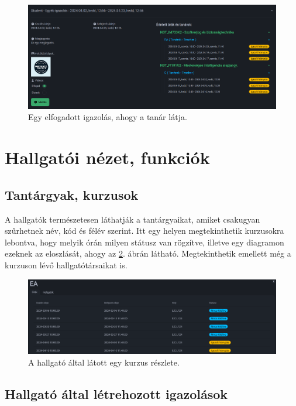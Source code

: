 \documentclass[
]{thesis-ekf}
\theoremstyle{definition}
\theoremstyle{remark}
\begin{document}
\begin{figure}[ht!]
	\centering
	\includegraphics[width=15cm]{../pictures/screenshots/just_teacher.png}
	\caption{Egy elfogadott igazolás, ahogy a tanár látja.}
	\label{justTeacher}
\end{figure}

\section{Hallgatói nézet, funkciók}

\subsection{Tantárgyak, kurzusok}

A hallgatók természetesen láthatják a tantárgyaikat, amiket csakugyan szűrhetnek név, kód és félév szerint. Itt egy helyen megtekinthetik kurzusokra lebontva, hogy melyik órán milyen státusz van rögzítve, illetve egy diagramon ezeknek az eloszlását, ahogy az \ref{studentCourse}. ábrán látható. Megtekinthetik emellett még a kurzuson lévő hallgatótársaikat is.

\begin{figure}[h!]
	\centering
	\includegraphics[width=15cm]{../pictures/screenshots/student_course.png}
	\caption{A hallgató által látott egy kurzus részlete.}
	\label{studentCourse}
\end{figure}

\subsection{Hallgató által létrehozott igazolások}
\end{document}
